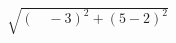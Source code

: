\documentclass[preview]{standalone}
\begin{document}
\begin{align*}
\sqrt{ ( \quad - 3 ) ^{2} + ( 5 - 2 ) ^{2}}
\end{align*}
\end{document}
